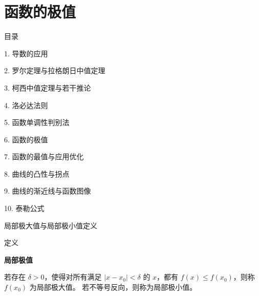 \documentclass[aspectratio=169,10pt,fontset=fandol]{ctexbeamer}
\begin{document}
\section{函数的极值}
\begin{frame}[t,fragile]{目录}
\normalsize
{\color{black}\normalsize 1. 导数的应用\par}\vspace{0.22em}
{\color{black}\normalsize 2. 罗尔定理与拉格朗日中值定理\par}\vspace{0.22em}
{\color{black}\normalsize 3. 柯西中值定理与若干推论\par}\vspace{0.22em}
{\color{black}\normalsize 4. 洛必达法则\par}\vspace{0.22em}
{\color{black}\normalsize 5. 函数单调性判别法\par}\vspace{0.22em}
{\color{blue}\normalsize 6. 函数的极值\par}\vspace{0.22em}
{\color{gray!40}\normalsize 7. 函数的最值与应用优化\par}\vspace{0.22em}
{\color{gray!40}\normalsize 8. 曲线的凸性与拐点\par}\vspace{0.22em}
{\color{gray!40}\normalsize 9. 曲线的渐近线与函数图像\par}\vspace{0.22em}
{\color{gray!40}\normalsize 10. 泰勒公式\par}\vspace{0.22em}
\end{frame}
\begin{frame}[t,fragile]{局部极大值与局部极小值定义}
\normalsize
\begin{block}{定义}
{\normalsize
\textbf{局部极值}\par

若存在 $\delta>0$，使得对所有满足 $|x-x_0|<\delta$ 的 $x$，都有 $f(x)\leq f(x_0)$，则称 $f(x_0)$ 为局部极大值。 若不等号反向，则称为局部极小值。

}
\end{block}
\end{frame}
\end{document}
